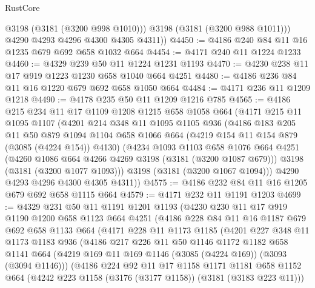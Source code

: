 \begin{lexlean}{RustCore}
\begin{coremodule}
            @3198
            (@3181 (@3200 @998 @1010)))
          @3198
          (@3181 (@3200 @988 @1011)))
        @4290
        @4293
        @4296
        @4300
        @4305
        @4311))
@4450 := @4186 @240 @84 @11 @16 @1235 @679 @692 @658 @1032 @664
@4454 := @4171 @240 @11 @1224 @1233
@4460 := @4329 @239 @50 @11 @1224 @1231 @1193
@4470 := @4230 @238 @11 @17 @919 @1223 @1230 @658 @1040 @664 @4251
@4480 := @4186 @236 @84 @11 @16 @1220 @679 @692 @658 @1050 @664
@4484 := @4171 @236 @11 @1209 @1218
@4490 := @4178 @235 @50 @11 @1209 @1216 @785
@4565 := @4186
    @215
    @234
    @11
    @17
    @1109
    @1208
    @1215
    @658
    @1058
    @664
    (@4171
      @215
      @11
      @1095
      @1107
      (@4201
        @214
        @348
        @11
        @1095
        @1105
        @936
        (@4186
          @183
          @205
          @11
          @50
          @879
          @1094
          @1104
          @658
          @1066
          @664
          (@4219 @154 @11 @154 @879 (@3085 (@4224 @154)) @4130)
          (@4234
            @1093
            @1103
            @658
            @1076
            @664
            @4251
            (@4260 @1086 @664 @4266 @4269 @3198 (@3181 (@3200 @1087 @679)))
            @3198
            (@3181 (@3200 @1077 @1093)))
          @3198
          (@3181 (@3200 @1067 @1094)))
        @4290
        @4293
        @4296
        @4300
        @4305
        @4311))
@4575 := @4186 @232 @84 @11 @16 @1205 @679 @692 @658 @1115 @664
@4579 := @4171 @232 @11 @1191 @1203
@4699 := @4329
    @231
    @50
    @11
    @1191
    @1201
    @1193
    (@4230
      @230
      @11
      @17
      @919
      @1190
      @1200
      @658
      @1123
      @664
      @4251
      (@4186
        @228
        @84
        @11
        @16
        @1187
        @679
        @692
        @658
        @1133
        @664
        (@4171
          @228
          @11
          @1173
          @1185
          (@4201
            @227
            @348
            @11
            @1173
            @1183
            @936
            (@4186
              @217
              @226
              @11
              @50
              @1146
              @1172
              @1182
              @658
              @1141
              @664
              (@4219 @169 @11 @169 @1146 (@3085 (@4224 @169)) (@3093 (@3094 @1146)))
              (@4186
                @224
                @92
                @11
                @17
                @1158
                @1171
                @1181
                @658
                @1152
                @664
                (@4242 @223 @1158 (@3176 (@3177 @1158)) (@3181 (@3183 @223 @11)))

\end{coremodule}
\end{lexlean}
